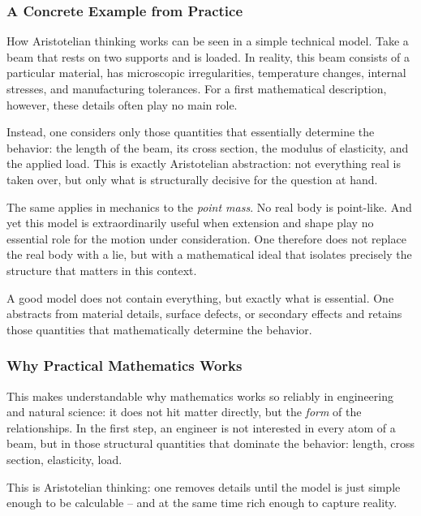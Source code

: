 \subsubsection*{A Concrete Example from Practice}

How Aristotelian thinking works
can be seen in a simple technical model.
Take a beam
that rests on two supports and is loaded.
In reality, this beam consists of a particular material,
has microscopic irregularities,
temperature changes,
internal stresses, and manufacturing tolerances.
For a first mathematical description, however, these details often play no main role.

Instead, one considers only those quantities
that essentially determine the behavior:
the length of the beam,
its cross section,
the modulus of elasticity,
and the applied load.
This is exactly Aristotelian abstraction:
not everything real is taken over,
but only what is structurally decisive
for the question at hand.

The same applies in mechanics to the \emph{point mass}.
No real body is point-like.
And yet this model is extraordinarily useful
when extension and shape play no essential role
for the motion under consideration.
One therefore does not replace the real body with a lie,
but with a mathematical ideal
that isolates precisely the structure
that matters in this context.

\begin{DidacticBox}
	\label{box:aristotle-engineering}
	\small
	A good model does not contain everything,
	but exactly what is essential.
	One abstracts from material details,
	surface defects, or secondary effects
	and retains those quantities
	that mathematically determine the behavior.
\end{DidacticBox}

\subsubsection*{Why Practical Mathematics Works}

This makes understandable
why mathematics works so reliably in engineering and natural science:
it does not hit matter directly,
but the \emph{form} of the relationships.
In the first step, an engineer is not interested in every atom of a beam,
but in those structural quantities
that dominate the behavior:
length,
cross section,
elasticity,
load.

This is Aristotelian thinking:
one removes details
until the model is just simple enough
to be calculable --
and at the same time rich enough
to capture reality.

